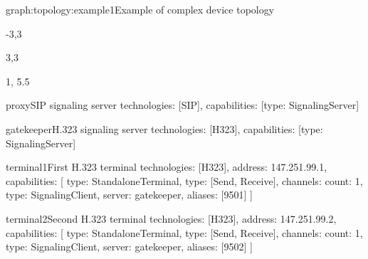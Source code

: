 \begin{Graph}{graph:topology:example1}{Example of complex device topology}  
  \begin{SubGraph}{-3,3}{}
  \end{SubGraph}
  
  \begin{SubGraph}{3,3}{}
  \end{SubGraph}
  
  
  \begin{GraphLegend}{1, 5.5}
  \end{GraphLegend}
\end{Graph}

\begin{TopologyExample}{proxy}{SIP signaling server}
technologies: [SIP], capabilities: [{type: SignalingServer}]
\end{TopologyExample}

\begin{TopologyExample}{gatekeeper}{H.323 signaling server}
technologies: [H323], capabilities: [{type: SignalingServer}]
\end{TopologyExample}

\begin{TopologyExample}{terminal1}{First H.323 terminal}
technologies: [H323], address: 147.251.99.1,
capabilities: [
  {type: StandaloneTerminal}, {type: [Send, Receive], channels: {count: 1}}, 
  {type: SignalingClient, server: gatekeeper, aliases: [9501]}
]
\end{TopologyExample}

\begin{TopologyExample}{terminal2}{Second H.323 terminal}
technologies: [H323], address: 147.251.99.2,
capabilities: [
  {type: StandaloneTerminal}, {type: [Send, Receive], channels: {count: 1}}, 
  {type: SignalingClient, server: gatekeeper, aliases: [9502]}
]
\end{TopologyExample}

